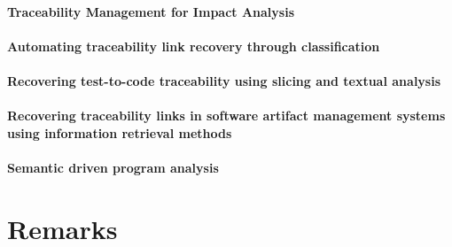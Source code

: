 \paragraph*{Traceability Management for Impact Analysis}
\cite{DelukaFR2008}

\paragraph*{Automating traceability link recovery through classification}
\cite{Mills:2017:ATL:3106237.3121280}

\paragraph*{Recovering test-to-code traceability using slicing and textual analysis} 
\cite{Qusef:2014:RTT:2747015.2747194}

\paragraph*{Recovering traceability links in software artifact management systems using information retrieval methods}
\cite{Lucia:2007:RTL:1276933.1276934}

\paragraph*{Semantic driven program analysis}
\cite{Marcus2004}


\section{Remarks}


